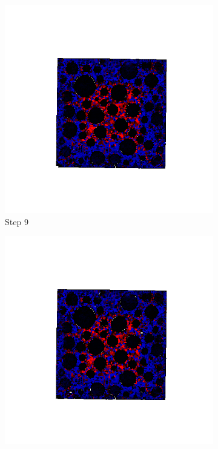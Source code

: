 \begin{figure}[ht!]
      \begin{subfigure}{.25\textwidth}
        \centering
        \includegraphics[width=1.0\linewidth]{Files/A30X0C_3_IS/DEP50-STEP(009).png}
      \caption{Step 9}
      \end{subfigure}%
      \begin{subfigure}{.25\textwidth}
        \centering
        \includegraphics[width=1.0\linewidth]{Files/A30X0C_3_IS/DEP50-STEP(010).png}

\end{subfigure}
\end{figure}

